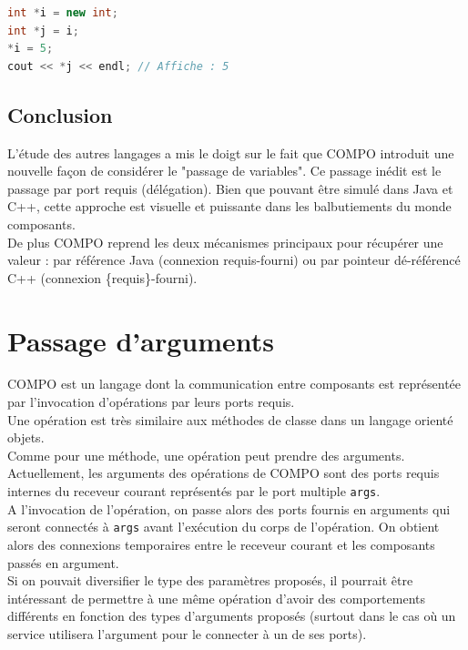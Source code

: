 \documentclass[11pt,a4paper,openany,oneside]{book}
\begin{document}
\begin{lstlisting}[language=C++, frame=single, caption=Exemple en c++]
int *i = new int;
int *j = i;
*i = 5;
cout << *j << endl; // Affiche : 5
\end{lstlisting}

\subsection{Conclusion}
L'étude des autres langages a mis le doigt sur le fait que COMPO introduit une nouvelle façon de considérer le "passage de variables". Ce passage inédit est le passage par port requis (délégation). Bien que pouvant être simulé dans Java et C++, cette approche est visuelle et puissante dans les balbutiements du monde composants.\\
De plus COMPO reprend les deux mécanismes principaux pour récupérer une valeur : par référence Java (connexion requis-fourni) ou par pointeur dé-référencé C++ (connexion \{requis\}-fourni).



\newpage

\section{Passage d'arguments}

COMPO est un langage dont la communication entre composants est représentée par l'invocation d'opérations par leurs ports requis.\\
Une opération est très similaire aux méthodes de classe dans un langage orienté objets.\\
Comme pour une méthode, une opération peut prendre des arguments.
Actuellement, les arguments des opérations de COMPO sont des ports requis internes du receveur courant représentés par le port multiple \texttt{args}.\\
A l'invocation de l'opération, on passe alors des ports fournis en arguments qui seront connectés à \texttt{args} avant l'exécution du corps de l'opération. On obtient alors des connexions temporaires entre le receveur courant et les composants passés en argument.\\ 
Si on pouvait diversifier le type des paramètres proposés, il pourrait être intéressant de permettre à une même opération d'avoir des comportements différents en fonction des types d'arguments proposés (surtout dans le cas où un service utilisera l'argument pour le connecter à un de ses ports).
\end{document}
